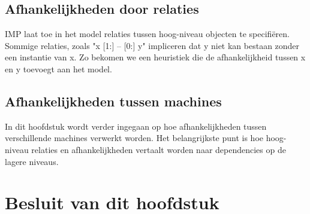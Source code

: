 \subsection{Afhankelijkheden door relaties}
\label{subs:relaties}
IMP laat toe in het model relaties tussen hoog-niveau objecten te specifi\"eren.
Sommige relaties, zoals "x [1:] -- [0:] y" impliceren dat y niet kan bestaan zonder een instantie van x.
Zo bekomen we een heuristiek die de afhankelijkheid tussen x en y toevoegt aan het model.

\subsection{Afhankelijkheden tussen machines}
In dit hoofdstuk wordt verder ingegaan op hoe afhankelijkheden tussen verschillende machines verwerkt worden.
Het belangrijkste punt is hoe hoog-niveau relaties en afhankelijkheden vertaalt worden naar dependencies op de lagere niveaus.

\section{Besluit van dit hoofdstuk}
